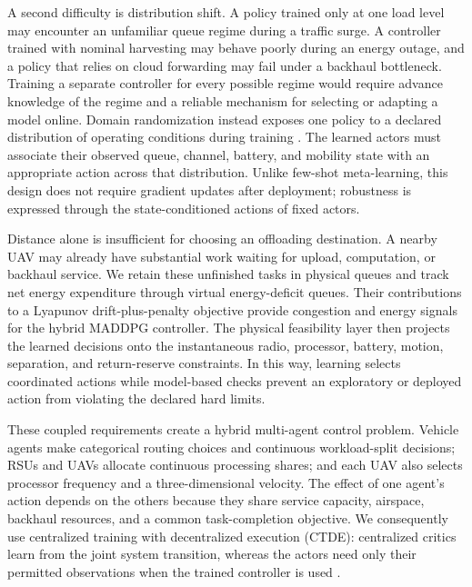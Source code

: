 \documentclass[journal]{IEEEtran}
\begin{document}
A second difficulty is distribution shift. A policy trained only at one load
level may encounter an unfamiliar queue regime during a traffic surge. A
controller trained with nominal harvesting may behave poorly during an
energy outage, and a policy that relies on cloud forwarding may fail under a
backhaul bottleneck. Training a separate controller for every possible regime
would require advance knowledge of the regime and a reliable mechanism for
selecting or adapting a model online. Domain randomization instead exposes one
policy to a declared distribution of operating conditions during training
\cite{tobin2017domain,peng2018sim}. The learned actors must associate their
observed queue, channel, battery, and mobility state with an appropriate action
across that distribution. Unlike few-shot meta-learning, this design does not
require gradient updates after deployment; robustness is expressed through
the state-conditioned actions of fixed actors.

Distance alone is insufficient for choosing an offloading destination. A
nearby UAV may already have substantial work waiting for upload, computation,
or backhaul service. We retain these unfinished tasks in physical queues and
track net energy expenditure through virtual energy-deficit queues. Their
contributions to a Lyapunov drift-plus-penalty objective provide congestion
and energy signals for the hybrid MADDPG controller. The physical feasibility
layer then projects the learned decisions onto the instantaneous radio,
processor, battery, motion, separation, and return-reserve constraints. In
this way, learning selects coordinated actions while model-based checks prevent
an exploratory or deployed action from violating the declared hard limits.

These coupled requirements create a hybrid multi-agent control problem.
Vehicle agents make categorical routing choices and continuous workload-split
decisions; RSUs and UAVs allocate continuous processing shares; and each UAV
also selects processor frequency and a three-dimensional velocity. The effect
of one agent's action depends on the others because they share service
capacity, airspace, backhaul resources, and a common task-completion objective.
We consequently use centralized training with decentralized execution (CTDE):
centralized critics learn from the joint system transition, whereas the actors
need only their permitted observations when the trained controller is used
\cite{lowe2017multi}.
\end{document}
